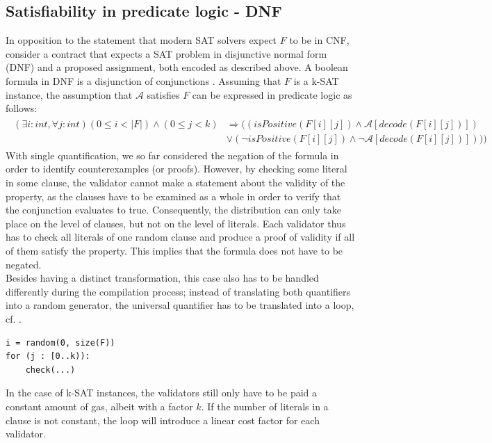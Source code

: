 \subsection{Satisfiability in predicate logic - DNF}\label{sec:dnf}
In opposition to the statement that modern SAT solvers expect $F$ to be in CNF, consider a contract that expects a SAT problem in disjunctive normal form (DNF) and a proposed assignment, both encoded as described above. A boolean formula in DNF is a disjunction of conjunctions \cite{dnf_math_encycl}. Assuming that $F$ is a k-SAT instance, the assumption that $\mathcal{A}$ satisfies $F$ can be expressed in predicate logic as follows:
\begin{gather*}\label{eq:dnf_sat}
\begin{aligned}
(\exists i : int, \forall j : int) (0 \leq i < |F|) \wedge (0 \leq j < k) &\Rightarrow ((isPositive(F[i][j]) \wedge \mathcal{A}[decode(F[i][j])]) \\
&\vee (\neg isPositive(F[i][j]) \wedge \neg \mathcal{A}[decode(F[i][j])])))
\end{aligned}
\end{gather*}
With single quantification, we so far considered the negation of the formula in order to identify counterexamples (or proofs). However, by checking some literal in some clause, the validator cannot make a statement about the validity of the property, as the clauses have to be examined as a whole in order to verify that the conjunction evaluates to true. Consequently, the distribution can only take place on the level of clauses, but not on the level of literals. Each validator thus has to check all literals of one random clause and produce a proof of validity if all of them satisfy the property. This implies that the formula does not have to be negated. \\
Besides having a distinct transformation, this case also has to be handled differently during the compilation process; instead of translating both quantifiers into a random generator, the universal quantifier has to be translated into a loop, cf. .
\begin{lstlisting}[label=lst:rand_loop, numbers=none, caption=Translation of an assertion for a DNF SAT problem in pseudo-code]
i = random(0, size(F))
for (j : [0..k)):
	check(...)
\end{lstlisting}
In the case of k-SAT instances, the validators still only have to be paid a constant amount of gas, albeit with a factor $k$. If the number of literals in a clause is not constant, the loop will introduce a linear cost factor for each validator.

